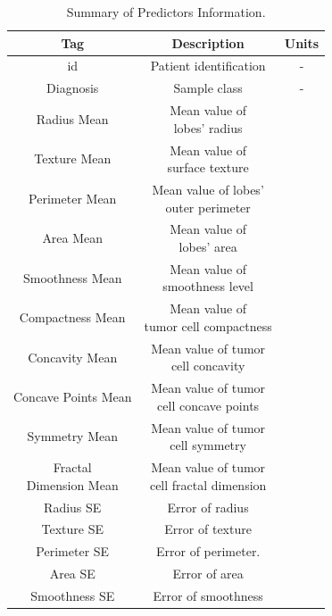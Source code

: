 \documentclass[conference]{IEEEtran}
\begin{document}
\begin{table}[htbp]
\caption{Summary of Predictors Information.}
\begin{center}
\begin{tabular}{|c|c|c|}
    \hline
    \cline{2-3} 
    Tag & Description & Units \\
    \hline
    id & Patient identification & - \\
    \hline
    Diagnosis & Sample class & - \\
    \hline
    Radius Mean & \makecell{Mean value of \\ lobes' radius} &  \\
    \hline
    Texture Mean & \makecell{Mean value of \\ surface texture} &  \\
    \hline
    Perimeter Mean & \makecell{Mean value of lobes' \\ outer perimeter}  &  \\
    \hline
    Area Mean & \makecell{Mean value of \\ lobes' area} &  \\
    \hline
    Smoothness Mean & \makecell{Mean value of \\ smoothness level} &  \\
    \hline
    Compactness Mean & \makecell{Mean value of \\ tumor cell compactness} &  \\
    \hline
    Concavity Mean & \makecell{Mean value of tumor \\ cell concavity} &  \\
    \hline
    Concave Points Mean &  \makecell{Mean value of tumor\\ cell concave points} &  \\
    \hline
    Symmetry Mean & \makecell{Mean value of tumor\\ cell symmetry} &  \\
    \hline
    \makecell{Fractal \\ Dimension Mean} & \makecell{Mean value of tumor \\ cell fractal dimension} &  \\
    \hline
    Radius SE & Error of radius &  \\
    \hline
    Texture SE & Error of texture &  \\
    \hline
    Perimeter SE & Error of perimeter. &  \\
    \hline
    Area SE & Error of area &  \\
    \hline
    Smoothness SE & Error of smoothness &  \\

\end{tabular}
\end{center}
\end{table}
\end{document}
